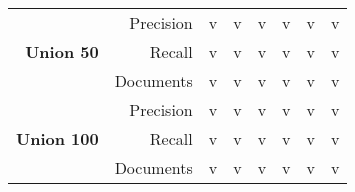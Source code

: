 \begin{table}[h!]
\begin{tabular}{rrcccccc}
        \multirow{3}{*}{\textbf{Union 50}} & Precision & v & v & v & v & v & v \\
                               & Recall & v & v & v & v & v & v \\
                               & Documents & v & v & v & v & v & v \\
        \midrule

        \multirow{3}{*}{\textbf{Union 100}} & Precision & v & v & v & v & v & v \\
                               & Recall & v & v & v & v & v & v \\
                               & Documents & v & v & v & v & v & v \\

        \bottomrule 
    \end{tabular}
\end{table}

